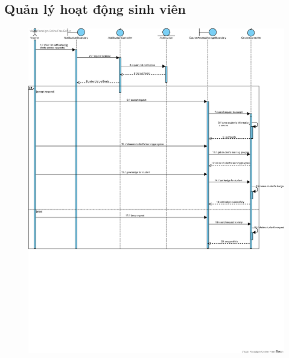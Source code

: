 \documentclass[./../main_file.tex]{subfiles}
\begin{document}
	\subsection{Quản lý hoạt động sinh viên }
	\begin{figure}[H]
		\centering
		\includegraphics[width=\linewidth]{./images/sequence_diagram/3_11_manage_studentactivity.eps}
	\end{figure}
	
\end{document}
